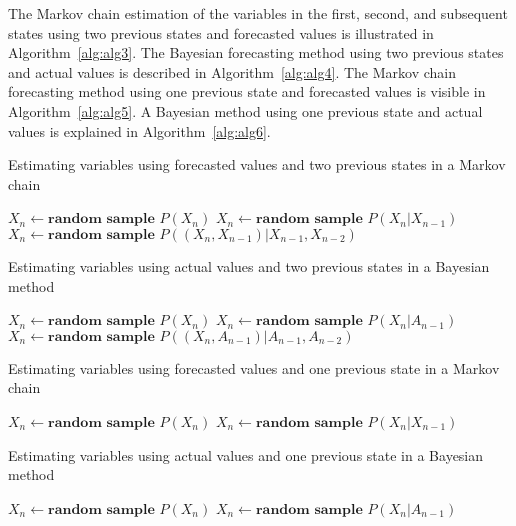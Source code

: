 \documentclass[preprint,12pt]{elsarticle}
\begin{document}
The Markov chain estimation of the variables in the first, second, and subsequent states using two previous states and forecasted values is illustrated in Algorithm~\ref{alg:alg3}. The Bayesian forecasting method using two previous states and actual values is described in Algorithm~\ref{alg:alg4}. The Markov chain forecasting method using one previous state and forecasted values is visible in Algorithm~\ref{alg:alg5}. A Bayesian method using one previous state and actual values is explained in Algorithm~\ref{alg:alg6}.

\begin{algorithm}[H] 
\caption{Estimating variables using forecasted values and two previous states in a Markov chain}
\begin{algorithmic}\label{alg:alg3}
 \STATE $X_{n} \gets \textbf{random sample } P(X_{n})$ \ENDIF
{} \STATE $X_{n} \gets \textbf{random sample } P(X_{n}|X_{n-1})$ \ENDIF
{} \STATE $X_{n} \gets \textbf{random sample } P((X_{n},X_{n-1})|X_{n-1},X_{n-2})$ \ENDIF
\ENDFOR
\end{algorithmic}
\end{algorithm}

\begin{algorithm}[H] 
\caption{Estimating variables using actual values and two previous states in a Bayesian method}
\begin{algorithmic}\label{alg:alg4}
 \STATE $X_{n} \gets \textbf{random sample } P(X_{n})$ \ENDIF
{} \STATE $X_{n} \gets \textbf{random sample } P(X_{n}|A_{n-1})$ \ENDIF
{} \STATE $X_{n} \gets \textbf{random sample } P((X_{n},A_{n-1})|A_{n-1},A_{n-2})$ \ENDIF
\ENDFOR
\end{algorithmic}
\end{algorithm}

\begin{algorithm}[H] 
\caption{Estimating variables using forecasted values and one previous state in a Markov chain}
\begin{algorithmic}\label{alg:alg5}
 \STATE $X_{n} \gets \textbf{random sample } P(X_{n})$ \ENDIF
{} \STATE $X_{n} \gets \textbf{random sample } P(X_{n}|X_{n-1})$ \ENDIF
\ENDFOR
\end{algorithmic}
\end{algorithm}

\begin{algorithm}[H] 
\caption{Estimating variables using actual values and one previous state in a Bayesian method}
\begin{algorithmic}\label{alg:alg6}
 \STATE $X_{n} \gets \textbf{random sample } P(X_{n})$ \ENDIF
{} \STATE $X_{n} \gets \textbf{random sample } P(X_{n}|A_{n-1})$ \ENDIF
\ENDFOR
\end{algorithmic}
\end{algorithm}
\end{document}
